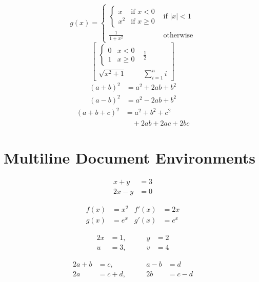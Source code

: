 \documentclass[12pt]{article}
\begin{document}
\[
g(x)=\begin{cases}
\begin{cases}x&\text{if }x<0\\x^2&\text{if }x\geq0\end{cases}&\text{if }|x|<1\\
\frac{1}{1+x^2}&\text{otherwise}
\end{cases}
\]
\[
\begin{bmatrix}
\begin{cases}0&x<0\\1&x\geq0\end{cases} & \frac{1}{2} \\
\sqrt{x^2+1} & \sum_{i=1}^{n}i
\end{bmatrix}
\]
\begin{equation}
\begin{aligned}
(a+b)^2 &= a^2+2ab+b^2 \\
(a-b)^2 &= a^2-2ab+b^2
\end{aligned}
\end{equation}
\begin{equation}
\begin{split}
(a+b+c)^2 &= a^2+b^2+c^2 \\
&\quad +2ab+2ac+2bc
\end{split}
\end{equation}

\section{Multiline Document Environments}

\begin{align}
x+y &= 3 \\
2x-y &= 0
\end{align}

\begin{align*}
f(x) &= x^2 & f'(x) &= 2x \\
g(x) &= e^x & g'(x) &= e^x
\end{align*}

\begin{alignat}{2}
x &= 1, &\qquad y &= 2 \\
u &= 3, &\qquad v &= 4
\end{alignat}

\begin{alignat*}{2}
a+b &= c, &\qquad a-b &= d \\
2a &= c+d, &\qquad 2b &= c-d
\end{alignat*}
\end{document}
